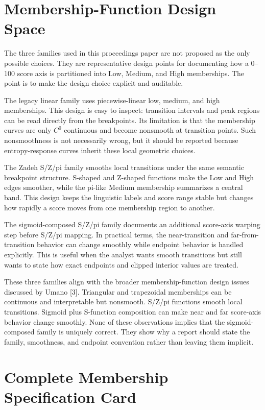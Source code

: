 \documentclass[a4paper,10pt,twocolumn]{myjarticle2}
\begin{document}
\section{Membership-Function Design Space}

The three families used in this proceedings paper are not proposed as the only
possible choices. They are representative design points for documenting how a
0--100 score axis is partitioned into Low, Medium, and High memberships. The
point is to make the design choice explicit and auditable.

The legacy linear family uses piecewise-linear low, medium, and high
memberships. This design is easy to inspect: transition intervals and peak
regions can be read directly from the breakpoints. Its limitation is that the
membership curves are only $C^0$ continuous and become nonsmooth at transition
points. Such nonsmoothness is not necessarily wrong, but it should be reported
because entropy-response curves inherit these local geometric choices.

The Zadeh S/Z/pi family smooths local transitions under the same semantic
breakpoint structure. S-shaped and Z-shaped functions make the Low and High
edges smoother, while the pi-like Medium membership summarizes a central band.
This design keeps the linguistic labels and score range stable but changes how
rapidly a score moves from one membership region to another.

The sigmoid-composed S/Z/pi family documents an additional score-axis warping
step before S/Z/pi mapping. In practical terms, the near-transition and
far-from-transition behavior can change smoothly while endpoint behavior is
handled explicitly. This is useful when the analyst wants smooth transitions
but still wants to state how exact endpoints and clipped interior values are
treated.

These three families align with the broader membership-function design issues
discussed by Umano [3]. Triangular and trapezoidal memberships can be
continuous and interpretable but nonsmooth. S/Z/pi functions smooth local
transitions. Sigmoid plus S-function composition can make near and far
score-axis behavior change smoothly. None of these observations implies that
the sigmoid-composed family is uniquely correct. They show why a report should
state the family, smoothness, and endpoint convention rather than leaving them
implicit.

\section{Complete Membership Specification Card}
\end{document}
